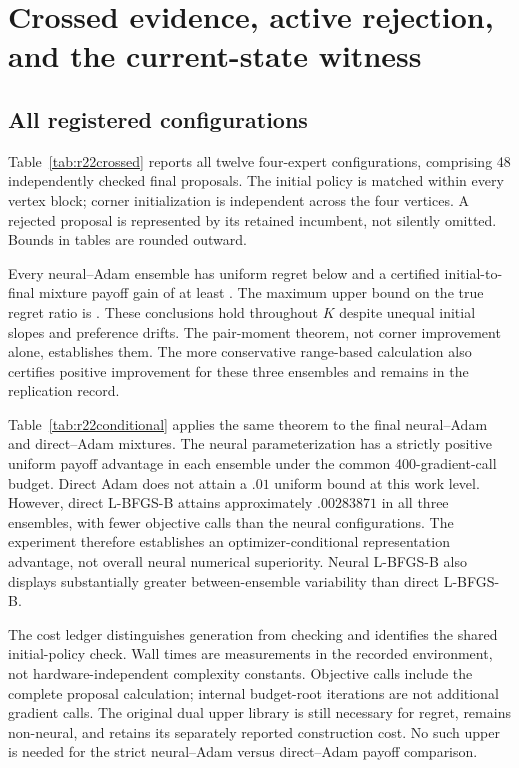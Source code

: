 \section{Crossed evidence, active rejection, and the current-state witness}\label{sec:r22results}
\subsection{All registered configurations}
Table~\ref{tab:r22crossed} reports all twelve four-expert configurations, comprising 48 independently checked final proposals. The initial policy is matched within every vertex block; corner initialization is independent across the four vertices. A rejected proposal is represented by its retained incumbent, not silently omitted. Bounds in tables are rounded outward.


Every neural--Adam ensemble has uniform regret below \RXXIINeuralRegret{} and a certified initial-to-final mixture payoff gain of at least \RXXIIGainMin{}. The maximum upper bound on the true regret ratio is \RXXIIRatioMax{}. These conclusions hold throughout $K$ despite unequal initial slopes and preference drifts. The pair-moment theorem, not corner improvement alone, establishes them. The more conservative range-based calculation also certifies positive improvement for these three ensembles and remains in the replication record.

Table~\ref{tab:r22conditional} applies the same theorem to the final neural--Adam and direct--Adam mixtures. The neural parameterization has a strictly positive uniform payoff advantage in each ensemble under the common 400-gradient-call budget. Direct Adam does not attain a $.01$ uniform bound at this work level. However, direct L-BFGS-B attains approximately $.00283871$ in all three ensembles, with fewer objective calls than the neural configurations. The experiment therefore establishes an optimizer-conditional representation advantage, not overall neural numerical superiority. Neural L-BFGS-B also displays substantially greater between-ensemble variability than direct L-BFGS-B.


The cost ledger distinguishes generation from checking and identifies the shared initial-policy check. Wall times are measurements in the recorded environment, not hardware-independent complexity constants. Objective calls include the complete proposal calculation; internal budget-root iterations are not additional gradient calls. The original dual upper library is still necessary for regret, remains non-neural, and retains its separately reported construction cost. No such upper is needed for the strict neural--Adam versus direct--Adam payoff comparison.

